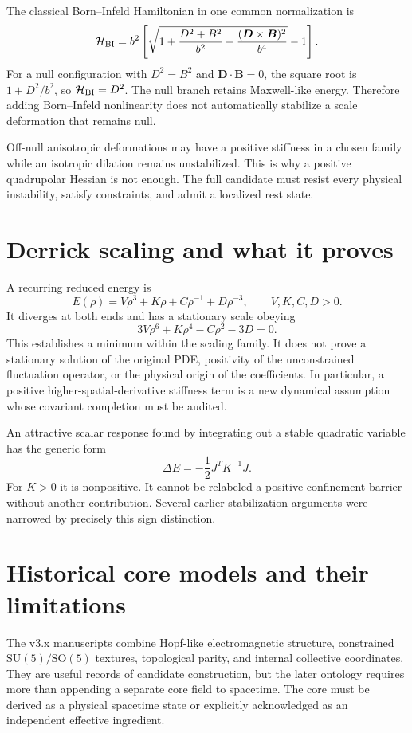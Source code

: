 \documentclass[11pt,oneside]{report}
\begin{document}
The classical Born--Infeld Hamiltonian in one common normalization is
\begin{equation}
\mathcal H_{\rm BI}=b^2\left[\sqrt{1+\frac{D^2+B^2}{b^2}
+\frac{(\bm D\times\bm B)^2}{b^4}}-1\right].
\end{equation}
For a null configuration with $D^2=B^2$ and $\bm D\cdot\bm B=0$, the square root is $1+D^2/b^2$, so $\mathcal H_{\rm BI}=D^2$. The null branch retains Maxwell-like energy. Therefore adding Born--Infeld nonlinearity does not automatically stabilize a scale deformation that remains null.

Off-null anisotropic deformations may have a positive stiffness in a chosen family while an isotropic dilation remains unstabilized. This is why a positive quadrupolar Hessian is not enough. The full candidate must resist every physical instability, satisfy constraints, and admit a localized rest state.

\section{Derrick scaling and what it proves}
A recurring reduced energy is
\begin{equation}
E(\rho)=V\rho^3+K\rho+C\rho^{-1}+D\rho^{-3},
\qquad V,K,C,D>0.
\end{equation}
It diverges at both ends and has a stationary scale obeying
\begin{equation}
3V\rho^6+K\rho^4-C\rho^2-3D=0.
\end{equation}
This establishes a minimum within the scaling family. It does not prove a stationary solution of the original PDE, positivity of the unconstrained fluctuation operator, or the physical origin of the coefficients. In particular, a positive higher-spatial-derivative stiffness term is a new dynamical assumption whose covariant completion must be audited.

An attractive scalar response found by integrating out a stable quadratic variable has the generic form
\begin{equation}
\Delta E=-\frac12J^TK^{-1}J.
\end{equation}
For $K>0$ it is nonpositive. It cannot be relabeled a positive confinement barrier without another contribution. Several earlier stabilization arguments were narrowed by precisely this sign distinction.

\section{Historical core models and their limitations}
The v3.x manuscripts combine Hopf-like electromagnetic structure, constrained $\mathrm{SU}(5)/\mathrm{SO}(5)$ textures, topological parity, and internal collective coordinates. They are useful records of candidate construction, but the later ontology requires more than appending a separate core field to spacetime. The core must be derived as a physical spacetime state or explicitly acknowledged as an independent effective ingredient.
\end{document}
